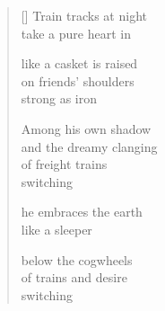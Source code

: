\documentclass[12pt,a4paper]{article}
\begin{document}

\newpage


\settowidth{\versewidth}{and the dreamy clanging}

\bigskip

\begin{verse}[\versewidth]
  Train tracks at night \\
  take a pure heart in

  like a casket is raised \\
  on friends' shoulders \\
  strong as iron

  Among his own shadow \\
  and the dreamy clanging \\
  of freight trains \\
  switching

  he embraces the earth \\
  like a sleeper

  below the cogwheels \\
  of trains and desire \\
  switching
\end{verse}
\end{document}

